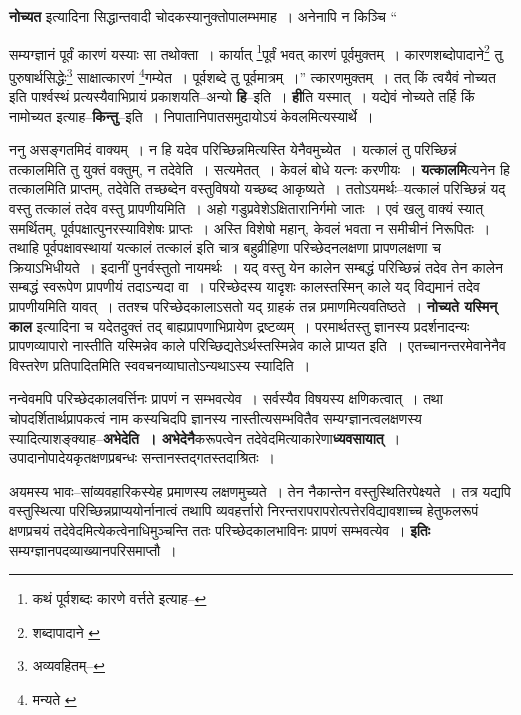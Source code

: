 \documentclass[article,12pt,a4paper]{memoir}
\begin{document}
	  \pstart \textbf{नोच्यत} इत्यादिना सिद्धान्तवादी चोदकस्यानुक्तोपालम्भमाह । अनेनापि न किञ्चि \leavevmode{} “
	  
	सम्यग्ज्ञानं पूर्वं कारणं यस्याः सा तथोक्ता । कार्यात् \footnote{कथं पूर्वशब्दः कारणे वर्त्तते इत्याह--\cite{dp-msD-n}}पूर्वं भवत् कारणं पूर्वमुक्तम् । कारणशब्दोपादाने\footnote{शब्दापादाने \cite{dp-msA} \cite{dp-msB}} तु पुरुषार्थसिद्धेः\footnote{अव्यवहितम्--\cite{dp-msD-n}} साक्षात्कारणं \footnote{मन्यते \cite{dp-msA} \cite{dp-edH}}गम्येत । पूर्वशब्दे तु पूर्वमात्रम् ।” त्कारणमुक्तम् । तत् किं त्वयैवं नोच्यत इति पार्श्वस्थं प्रत्यस्यैवाभिप्रायं प्रकाशयति--अन्यो \textbf{हि}--इति । \textbf{ही}ति यस्मात् । यद्येवं नोच्यते तर्हि किं नामोच्यत इत्याह--\textbf{किन्तु}--इति । निपातानिपातसमुदायोऽयं केवलमित्यस्यार्थे ।
	\pend
      

	  \pstart ननु असङ्गतमिदं वाक्यम् । न हि यदेव परिच्छिन्नमित्यस्ति येनैवमुच्येत । यत्कालं तु परिच्छिन्नं तत्कालमिति तु युक्तं वक्तुम्, न तदेवेति । सत्यमेतत् । केवलं बोधे यत्नः करणीयः । \textbf{यत्कालमि}त्यनेन हि तत्कालमिति प्राप्तम्, तदेवेति तच्छब्देन वस्तुविषयो यच्छब्द आकृष्यते । ततोऽयमर्थः--यत्कालं परिच्छिन्नं यद् वस्तु तत्कालं तदेव वस्तु प्रापणीयमिति । अहो गडुप्रवेशेऽक्षितारानिर्गमो जातः । एवं खलु वाक्यं स्यात् समर्थितम्, पूर्वपक्षात्पुनरस्याविशेषः प्राप्तः । अस्ति विशेषो महान्, केवलं भवता न समीचीनं निरूपितः । तथाहि पूर्वपक्षावस्थायां यत्कालं तत्कालं इति चात्र बहुव्रीहिणा परिच्छेदनलक्षणा प्रापणलक्षणा च क्रियाऽभिधीयते । इदानीं पुनर्वस्तुतो नायमर्थः । यद् वस्तु येन कालेन सम्बद्धं परिच्छिन्नं तदेव तेन कालेन सम्बद्धं स्वरूपेण प्रापणीयं तदाऽन्यदा वा । परिच्छेदस्य यादृशः कालस्तस्मिन् काले यद् विद्यमानं तदेव प्रापणीयमिति यावत् । ततश्च परिच्छेदका\leavevmode{}लाऽसतो यद् ग्राहकं तन्न प्रमाणमित्यवतिष्ठते । \textbf{नोच्यते यस्मिन् काल} इत्यादिना च यदेतदुक्तं तद् बाह्यप्रापणाभिप्रायेण द्रष्टव्यम् । परमार्थतस्तु ज्ञानस्य प्रदर्शनादन्यः प्रापणव्यापारो नास्तीति यस्मिन्नेव काले परिच्छिद्यतेऽर्थस्तस्मिन्नेव काले प्राप्यत इति । एतच्चानन्तरमेवानेनैव विस्तरेण प्रतिपादितमिति स्ववचनव्याघातोऽन्यथाऽस्य स्यादिति ।
	\pend
      

	  \pstart नन्वेवमपि परिच्छेदकालवर्त्तिनः प्रापणं न सम्भवत्येव । सर्वस्यैव विषयस्य क्षणिकत्वात् । तथा चोपदर्शितार्थप्रापकत्वं नाम कस्यचिदपि ज्ञानस्य नास्तीत्यसम्भवितैव सम्यग्ज्ञानत्वलक्षणस्य स्यादित्याशङ्क्याह--\textbf{अभेदेति । अभेदेनै}करूपत्वेन तदेवेदमित्याकारेणा\textbf{ध्यवसायात्} । उपादानोपादेयकृतक्षणप्रबन्धः सन्तानस्तद्गतस्तदाश्रितः ।
	\pend
      

	  \pstart अयमस्य भावः--सांव्यवहारिकस्येह प्रमाणस्य लक्षणमुच्यते । तेन नैकान्तेन वस्तुस्थितिरपेक्ष्यते । तत्र यद्यपि वस्तुस्थित्या परिच्छिन्नप्राप्ययोर्नानात्वं तथापि व्यवहर्त्तारो निरन्तरापरापरोत्पत्तेरविद्यावशाच्च हेतुफलरूपं क्षणप्रचयं तदेवेदमित्येकत्वेनाधिमुञ्चन्ति ततः परिच्छेदकालभाविनः प्रापणं सम्भवत्येव । \textbf{इतिः} सम्यग्ज्ञानपदव्याख्यानपरिसमाप्तौ ।
	\pend
      
\end{document}
